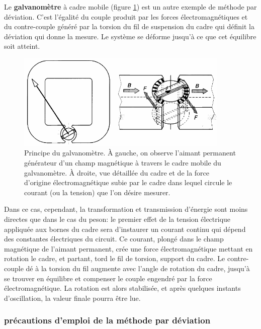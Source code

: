 \vspace{4mm}
Le \textbf{galvanomètre} à cadre mobile (figure \ref{fig:galva}) est un autre exemple de méthode par déviation. C'est l'égalité du couple produit par les forces électromagnétiques et du contre-couple généré par la torsion du fil de suspension du cadre qui définit la déviation qui donne la mesure. Le système se déforme jusqu'à ce que cet équilibre soit atteint.
\begin{figure}[h]
   \centering
   \includegraphics[height=4.6cm]{assets/figures/galva.pdf}
   \caption{Principe du galvanomètre. À gauche, on observe l'aimant permanent générateur d'un champ magnétique à travers le cadre mobile du galvanomètre. À droite, vue détaillée du cadre et de la force d'origine électromagnétique subie par le cadre dans lequel circule le courant (ou la tension) que l'on désire mesurer.}
   \label{fig:galva}
\end{figure}

Dans ce cas, cependant, la transformation et transmission d'énergie sont moins directes que dans le cas du peson: le premier effet de la tension électrique appliquée aux bornes du cadre sera d'instaurer un courant continu qui dépend des constantes électriques du circuit. Ce courant, plongé dans le champ magnétique de l'aimant permanent, crée une force électromagnétique mettant en rotation le cadre, et partant, tord le fil de torsion, support du cadre. Le contre-couple dé à la torsion du fil augmente avec l'angle de rotation du cadre, jusqu'à se trouver en équilibre et compenser le couple engendré par la force électromagnétique. La rotation est alors stabilisée, et après quelques instants d'oscillation, la valeur finale pourra être lue.

\subsubsection{précautions d'emploi de la méthode par déviation}

